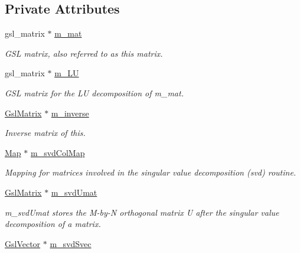 \subsection*{Private Attributes}
\begin{DoxyCompactItemize}
\item 
gsl\-\_\-matrix $\ast$ \hyperlink{class_q_u_e_s_o_1_1_gsl_matrix_a2cac0bd065e280a06445f944d5f3e3b3}{m\-\_\-mat}
\begin{DoxyCompactList}\small\item\em G\-S\-L matrix, also referred to as {\ttfamily this} matrix. \end{DoxyCompactList}\item 
gsl\-\_\-matrix $\ast$ \hyperlink{class_q_u_e_s_o_1_1_gsl_matrix_ada9c659bda4c71273af34e79eba4ec81}{m\-\_\-\-L\-U}
\begin{DoxyCompactList}\small\item\em G\-S\-L matrix for the L\-U decomposition of m\-\_\-mat. \end{DoxyCompactList}\item 
\hyperlink{class_q_u_e_s_o_1_1_gsl_matrix}{Gsl\-Matrix} $\ast$ \hyperlink{class_q_u_e_s_o_1_1_gsl_matrix_a153dc687fc0ce5f5ff1a5600df6ba914}{m\-\_\-inverse}
\begin{DoxyCompactList}\small\item\em Inverse matrix of {\ttfamily this}. \end{DoxyCompactList}\item 
\hyperlink{class_q_u_e_s_o_1_1_map}{Map} $\ast$ \hyperlink{class_q_u_e_s_o_1_1_gsl_matrix_a0457658d209ab7ac93fd82171e96afa9}{m\-\_\-svd\-Col\-Map}
\begin{DoxyCompactList}\small\item\em Mapping for matrices involved in the singular value decomposition (svd) routine. \end{DoxyCompactList}\item 
\hyperlink{class_q_u_e_s_o_1_1_gsl_matrix}{Gsl\-Matrix} $\ast$ \hyperlink{class_q_u_e_s_o_1_1_gsl_matrix_a764128029cce1c35d7371c6a7faf4161}{m\-\_\-svd\-Umat}
\begin{DoxyCompactList}\small\item\em m\-\_\-svd\-Umat stores the M-\/by-\/\-N orthogonal matrix U after the singular value decomposition of a matrix. \end{DoxyCompactList}\item 
\hyperlink{class_q_u_e_s_o_1_1_gsl_vector}{Gsl\-Vector} $\ast$ \hyperlink{class_q_u_e_s_o_1_1_gsl_matrix_a9c2d46159d01da442aba68fbeecb2dfc}{m\-\_\-svd\-Svec}

\end{DoxyCompactItemize}

